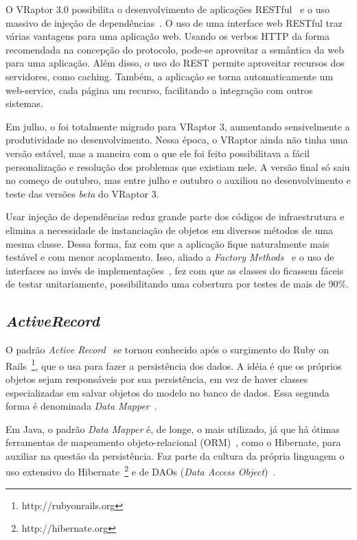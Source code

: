 O VRaptor 3.0 possibilita o desenvolvimento de aplicações RESTful~\cite{rest} e o uso massivo de injeção de dependências~\cite{di}. O uso de uma interface web RESTful traz várias vantagens para uma aplicação web. Usando os verbos HTTP da forma recomendada na concepção do protocolo, pode-se aproveitar a semântica da web para uma aplicação. Além disso, o uso do REST permite aproveitar recursos dos servidores, como caching. Também, a aplicação se torna automaticamente um web-service, cada página um recurso, facilitando a integração com outros sistemas.

Em julho, o \calopsita{} foi totalmente migrado para VRaptor 3, aumentando sensivelmente a produtividade no desenvolvimento. Nessa época, o VRaptor ainda não tinha uma versão estável, mas a maneira com o que ele foi feito possibilitava a fácil personalização e resolução dos problemas que existiam nele. A versão final só saiu no começo de outubro, mas entre julho e outubro o \calopsita{} auxiliou no desenvolvimento e teste das versões \textit{beta} do VRaptor 3.

Usar injeção de dependências reduz grande parte dos códigos de infraestrutura e elimina a necessidade de instanciação de objetos em diversos métodos de uma mesma classe. Dessa forma, faz com que a aplicação fique naturalmente mais testável e com menor acoplamento. Isso, aliado a \textit{Factory Methods}~\cite{gof} e o uso de interfaces ao invés de implementações~\cite{effective}, fez com que as classes do \calopsita{} ficassem fáceis de testar unitariamente, possibilitando uma cobertura por testes de mais de 90\%.

\subsection{\textit{ActiveRecord}}

O padrão \textit{Active Record}~\cite{fowler} se tornou conhecido após o surgimento do Ruby on Rails~\footnote{http://rubyonrails.org}, que o usa para fazer a persistência dos dados. A idéia é que os próprios objetos sejam responsáveis por sua persistência, em vez de haver classes especializadas em salvar objetos do modelo no banco de dados. Essa segunda forma é denominada \textit{Data Mapper}~\cite{fowler}.

Em Java, o padrão \textit{Data Mapper} é, de longe, o mais utilizado, já que há ótimas ferramentas de mapeamento objeto-relacional (ORM)~\cite{ORM}, como o Hibernate, para auxiliar na questão da persistência. Faz parte da cultura da própria linguagem o uso extensivo do Hibernate~\footnote{http://hibernate.org} e de DAOs (\textit{Data Access Object})~\cite{dao}.

